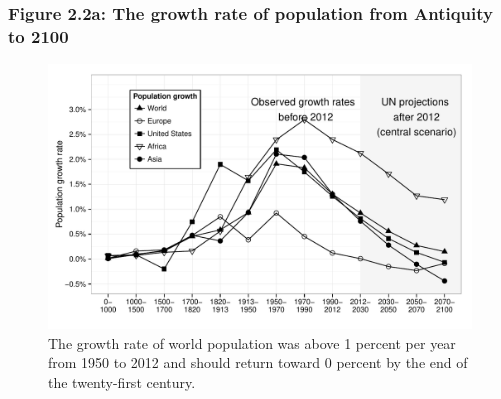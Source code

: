 \documentclass[t]{beamer}\usepackage[]{graphicx}\usepackage[]{color}
\newenvironment{knitrout}{}{} %
\begin{document}
\begin{frame}[label=Figure_2_2a]
\frametitle{Figure 2.2a: The growth rate of population from Antiquity to 2100}
\begin{figure}[t]
\begin{minipage}[b]{\textwidth}
\centering
\begin{knitrout}\footnotesize
{}\color{fgcolor}

{\centering \includegraphics[width=1\linewidth]{figures/bw/Figure_2_2a} 

}



\end{knitrout}
\caption{The growth rate of world population was above 1 percent per year from 1950 to 2012 and should return toward 0 percent by the end of the twenty-first century.}
\end{minipage}
\end{figure}
\end{frame}
\end{document}
